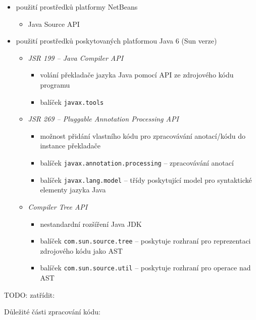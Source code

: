 \begin{itemize}
\begin{itemize}
\begin{itemize}
    \end{itemize}
  \end{itemize}
\item použití prostředků platformy NetBeans \cite{parsertools:javasourcejavadoc}
  \begin{itemize}
  \item Java Source API
  \end{itemize}
\item použití prostředků poskytovaných platformou Java 6 (Sun verze) \cite{source_code_analysis_corejavatechtips}
  \begin{itemize}
  \item \emph{JSR 199 -- Java Compiler API}
    \begin{itemize}
    \item volání překladače jazyka Java pomocí API ze zdrojového kódu programu
    \item balíček \verb+javax.tools+
    \end{itemize}
  \item \emph{JSR 269 -- Pluggable Annotation Processing API}
    \begin{itemize}
    \item možnost přidání vlastního kódu pro zpracovávání anotací/kódu do instance překladače
    \item balíček \verb+javax.annotation.processing+ -- zpracovávání anotací
    \item balíček \verb+javax.lang.model+ -- třídy poskytující model pro syntaktické elementy jazyka Java
    \end{itemize}
  \item \emph{Compiler Tree API} \cite{parsertools:compilertreeapi}
    \begin{itemize}
    \item nestandardní rozšíření Java JDK
    \item balíček \verb+com.sun.source.tree+ -- poskytuje rozhraní pro reprezentaci zdrojového kódu jako AST
    \item balíček \verb+com.sun.source.util+ -- poskytuje rozhraní pro operace nad AST
    \end{itemize}
  \end{itemize}
\end{itemize}

TODO: zatřídit:

Důležité části zpracování kódu:

